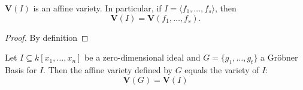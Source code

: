\begin{lemma}\label{V_I_equal_V_F}
  \( \mathbf{V}(I) \) is an affine variety. In particular, if \( I = \langle f_1, \ldots, f_s \rangle \), then
  \[
  \mathbf{V}(I) = \mathbf{V}(f_1, \ldots, f_s).
  \]
\end{lemma}
\begin{proof}
  By definition
\end{proof}

\begin{lemma}\label{V_G_equal_V_I}
  Let $I \subseteq k[x_1,\ldots,x_n]$ be a zero-dimensional ideal and $G = \{g_1,\ldots,g_t\}$ a Gröbner Basis for $I$. Then the affine variety defined by $G$ equals the variety of $I$:
  \[
  \mathbf{V}(G) = \mathbf{V}(I)
  \]
\end{lemma}